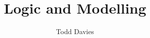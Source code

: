 \newcommand{\coursename}{Logic and Modelling}
\newcommand{\coursecode}{COMP21111}
\newcommand{\courseinfo}{}
\newcommand{\Author}{Todd Davies} 
\newcommand{\Title}{Logic and Modelling}
\author{\Author}
\title{\Title}
